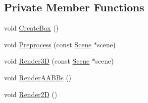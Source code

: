 \subsection*{Private Member Functions}
\begin{DoxyCompactItemize}
\item 
void \hyperlink{classmage_1_1_scene_renderer_a28c3d9c663d54e9a0f5867f3f8692655}{Create\+Box} ()
\item 
void \hyperlink{classmage_1_1_scene_renderer_afd9631ea4c3b1ec7b188c06ba01f1dfe}{Preprocess} (const \hyperlink{classmage_1_1_scene}{Scene} $\ast$scene)
\item 
void \hyperlink{classmage_1_1_scene_renderer_a5383182e4a0d2fc5e65d3ff57b3bd74f}{Render3D} (const \hyperlink{classmage_1_1_scene}{Scene} $\ast$scene)
\item 
void \hyperlink{classmage_1_1_scene_renderer_ae74d45783f968f4d06a12f683861cb93}{Render\+A\+A\+B\+Bs} ()
\item 
void \hyperlink{classmage_1_1_scene_renderer_a492e9395bc559180023758bb26e9e678}{Render2D} ()
\end{DoxyCompactItemize}

